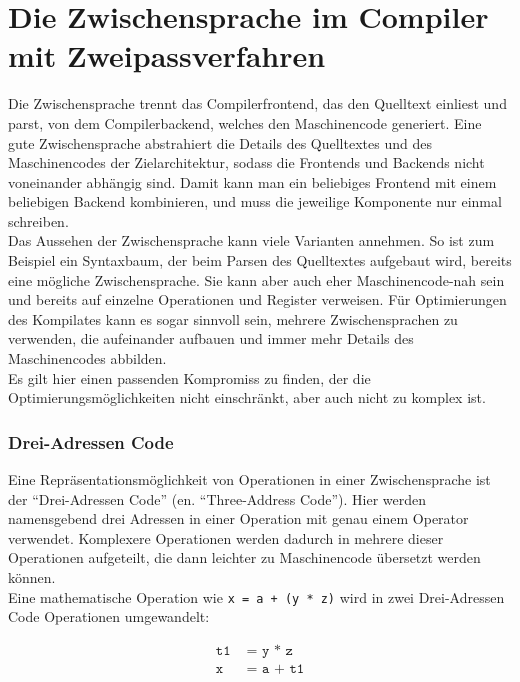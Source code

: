 \chapter{Die Zwischensprache im Compiler mit Zweipassverfahren}
\label{chap:theory:inBetweenLayer}

Die Zwischensprache trennt das Compilerfrontend, das den Quelltext einliest und parst, von dem Compilerbackend, welches den Maschinencode generiert.
Eine gute Zwischensprache abstrahiert die Details des Quelltextes und des Maschinencodes der Zielarchitektur, sodass die Frontends und Backends nicht voneinander abhängig sind.
Damit kann man ein beliebiges Frontend mit einem beliebigen Backend kombinieren, und muss die jeweilige Komponente nur einmal schreiben.\\
Das Aussehen der Zwischensprache kann viele Varianten annehmen.
So ist zum Beispiel ein Syntaxbaum, der beim Parsen des Quelltextes aufgebaut wird, bereits eine mögliche Zwischensprache.
Sie kann aber auch eher Maschinencode-nah sein und bereits auf einzelne Operationen und Register verweisen.
Für Optimierungen des Kompilates kann es sogar sinnvoll sein, mehrere Zwischensprachen zu verwenden, die aufeinander aufbauen und immer mehr Details des Maschinencodes abbilden.\\
Es gilt hier einen passenden Kompromiss zu finden, der die Optimierungsmöglichkeiten nicht einschränkt, aber auch nicht zu komplex ist.\\

\subsection{Drei-Adressen Code}

Eine Repräsentationsmöglichkeit von Operationen in einer Zwischensprache ist der ``Drei-Adressen Code'' (en. ``Three-Address Code'').
Hier werden namensgebend drei Adressen in einer Operation mit genau einem Operator verwendet\cite{aho:2006}.
Komplexere Operationen werden dadurch in mehrere dieser Operationen aufgeteilt, die dann leichter zu Maschinencode übersetzt werden können.\\
Eine mathematische Operation wie \texttt{x = a + (y * z)} wird in zwei Drei-Adressen Code Operationen umgewandelt:
\begin{figure}[H]
  \begin{align*}
    \texttt{t1} &\texttt{\ = y * z}\\
    \texttt{x} &\texttt{\ = a + t1}
  \end{align*}
\end{figure}

